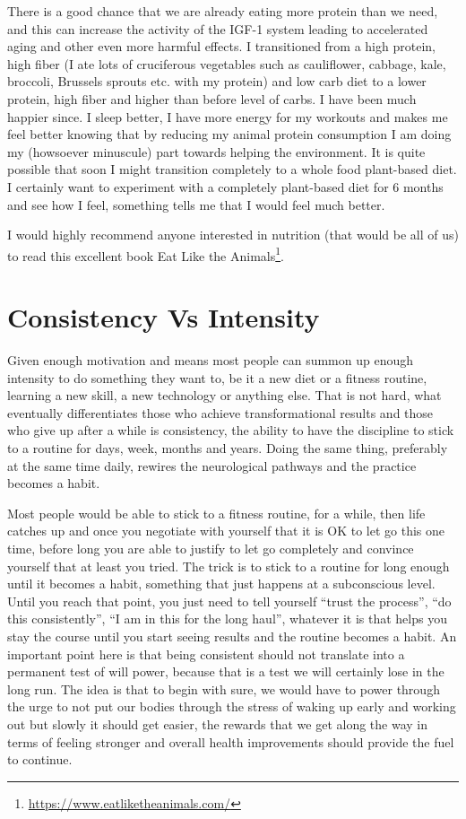 \documentclass[
  oneside]{book}
\DeclareRobustCommand{\href}[2]{#2\footnote{\url{#1}}}
\begin{document}
There is a good chance that we are already eating more protein than we need, and this can increase the activity of the IGF-1 system leading to accelerated aging and other even more harmful effects. I transitioned from a high protein, high fiber (I ate lots of cruciferous vegetables such as cauliflower, cabbage, kale, broccoli, Brussels sprouts etc. with my protein) and low carb diet to a lower protein, high fiber and higher than before level of carbs. I have been much happier since. I sleep better, I have more energy for my workouts and makes me feel better knowing that by reducing my animal protein consumption I am doing my (howsoever minuscule) part towards helping the environment. It is quite possible that soon I might transition completely to a whole food plant-based diet. I certainly want to experiment with a completely plant-based diet for 6 months and see how I feel, something tells me that I would feel much better.

I would highly recommend anyone interested in nutrition (that would be all of us) to read this excellent book \href{https://www.eatliketheanimals.com/}{Eat Like the Animals}.

\hypertarget{consistency-vs-intensity}{%
\section{Consistency Vs Intensity}\label{consistency-vs-intensity}}

Given enough motivation and means most people can summon up enough intensity to do something they want to, be it a new diet or a fitness routine, learning a new skill, a new technology or anything else. That is not hard, what eventually differentiates those who achieve transformational results and those who give up after a while is consistency, the ability to have the discipline to stick to a routine for days, week, months and years. Doing the same thing, preferably at the same time daily, rewires the neurological pathways and the practice becomes a habit.

Most people would be able to stick to a fitness routine, for a while, then life catches up and once you negotiate with yourself that it is OK to let go this one time, before long you are able to justify to let go completely and convince yourself that at least you tried. The trick is to stick to a routine for long enough until it becomes a habit, something that just happens at a subconscious level. Until you reach that point, you just need to tell yourself ``trust the process'', ``do this consistently'', ``I am in this for the long haul'', whatever it is that helps you stay the course until you start seeing results and the routine becomes a habit. An important point here is that being consistent should not translate into a permanent test of will power, because that is a test we will certainly lose in the long run. The idea is that to begin with sure, we would have to power through the urge to not put our bodies through the stress of waking up early and working out but slowly it should get easier, the rewards that we get along the way in terms of feeling stronger and overall health improvements should provide the fuel to continue.
\end{document}
